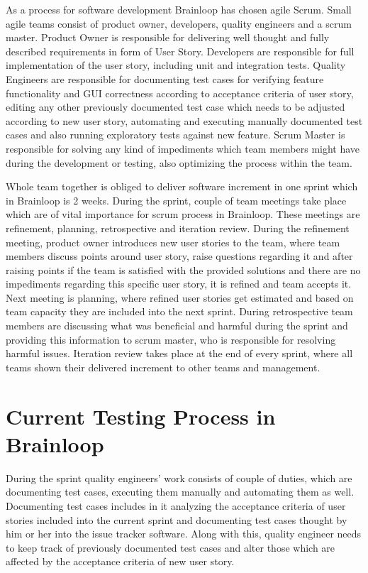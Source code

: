 \par
As a process for software development Brainloop has chosen agile Scrum. Small agile teams consist of product owner, developers, quality engineers and a scrum master. Product Owner is responsible for delivering well thought and fully described requirements in form of User Story. Developers are responsible for full implementation of the user story, including unit and integration tests. Quality Engineers are responsible for documenting test cases for verifying feature functionality and GUI correctness according to acceptance criteria of user story, editing any other previously documented test case which needs to be adjusted according to new user story, automating and executing manually documented test cases and also running exploratory tests against new feature. Scrum Master is responsible for solving any kind of impediments which team members might have during the development or testing, also optimizing the process within the team.

\par
Whole team together is obliged to deliver software increment in one sprint which in Brainloop is 2 weeks. During the sprint, couple of team meetings take place which are of vital importance for scrum process in Brainloop. These meetings are refinement, planning, retrospective and iteration review. During the refinement meeting, product owner introduces new user stories to the team, where team members discuss points around user story, raise questions regarding it and after raising points if the team is satisfied with the provided solutions and there are no impediments regarding this specific user story, it is refined and team accepts it. Next meeting is planning, where refined user stories get estimated and based on team capacity they are included into the next sprint. During retrospective team members are discussing what was beneficial and harmful during the sprint and providing this information to scrum master, who is responsible for resolving harmful issues. Iteration review takes place at the end of every sprint, where all teams shown their delivered increment to other teams and management.

\section{Current Testing Process in Brainloop}

\par
During the sprint quality engineers' work consists of couple of duties, which are documenting test cases, executing them manually and automating them as well. 
Documenting test cases includes in it analyzing the acceptance criteria of user stories included into the current sprint and documenting test cases thought by him or her into the issue tracker software. Along with this, quality engineer needs to keep track of previously documented test cases and alter those which are affected by the acceptance criteria of new user story.

